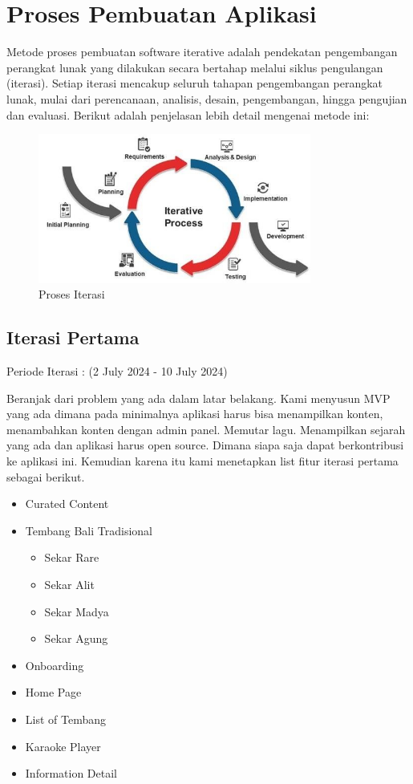 \section{Proses Pembuatan Aplikasi}
Metode proses pembuatan software iterative adalah pendekatan pengembangan perangkat lunak yang dilakukan secara bertahap melalui siklus pengulangan (iterasi). 
Setiap iterasi mencakup seluruh tahapan pengembangan perangkat lunak, mulai dari perencanaan, analisis, desain, pengembangan, hingga pengujian dan evaluasi. 
Berikut adalah penjelasan lebih detail mengenai metode ini:

\begin{figure}[H]
    \centering
    \includegraphics[width=0.8\textwidth]{assets/iterative.jpg}
    \caption{Proses Iterasi}
\end{figure}

\subsection{Iterasi Pertama}
Periode Iterasi : (2 July 2024 - 10 July 2024)

Beranjak dari problem yang ada dalam latar belakang. Kami menyusun MVP yang ada dimana pada minimalnya
aplikasi harus bisa menampilkan konten, menambahkan konten dengan admin panel. Memutar lagu. Menampilkan sejarah yang ada
dan aplikasi harus open source. Dimana siapa saja dapat berkontribusi ke aplikasi ini. Kemudian karena itu kami menetapkan 
list fitur iterasi pertama sebagai berikut.

\begin{itemize}
    \item Curated Content
    \item Tembang Bali Tradisional
    \begin{itemize}
        \item Sekar Rare
        \item Sekar Alit
        \item Sekar Madya
        \item Sekar Agung
    \end{itemize}
    \item Onboarding
    \item Home Page
    \item List of Tembang
    \item Karaoke Player
    \item Information Detail
\end{itemize}

